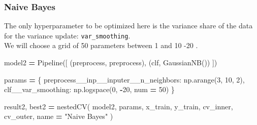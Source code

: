 \documentclass[
]{article}
\newenvironment{Shaded}{\begin{snugshade}}{\end{snugshade}}
\newcommand{\DecValTok}[1]{\textcolor[rgb]{0.00,0.00,0.81}{#1}}
\newcommand{\NormalTok}[1]{#1}
\newcommand{\OperatorTok}[1]{\textcolor[rgb]{0.81,0.36,0.00}{\textbf{#1}}}
\newcommand{\StringTok}[1]{\textcolor[rgb]{0.31,0.60,0.02}{#1}}
\begin{document}
\hypertarget{naive-bayes}{%
\subsubsection{Naive Bayes}\label{naive-bayes}}

The only hyperparameter to be optimized here is the variance share of
the data for the variance update: \texttt{var\_smoothing}.\\
We will choose a grid of 50 parameters between 1 and 10 -20 .

\begin{Shaded}
\begin{Highlighting}[]
\NormalTok{model2 }\OperatorTok{=}\NormalTok{ Pipeline([}
\NormalTok{    (}\StringTok{\textquotesingle{}preprocess\textquotesingle{}}\NormalTok{, preprocess),}
\NormalTok{    (}\StringTok{\textquotesingle{}clf\textquotesingle{}}\NormalTok{, GaussianNB())}
\NormalTok{])}

\NormalTok{params }\OperatorTok{=}\NormalTok{ \{}
    \StringTok{\textquotesingle{}preprocess\_\_inp\_\_inputer\_\_n\_neighbors\textquotesingle{}}\NormalTok{: np.arange(}\DecValTok{3}\NormalTok{, }\DecValTok{10}\NormalTok{, }\DecValTok{2}\NormalTok{),}
    \StringTok{\textquotesingle{}clf\_\_var\_smoothing\textquotesingle{}}\NormalTok{: np.logspace(}\DecValTok{0}\NormalTok{, }\OperatorTok{{-}}\DecValTok{20}\NormalTok{, num }\OperatorTok{=} \DecValTok{50}\NormalTok{)}
\NormalTok{\}}

\NormalTok{result2, best2 }\OperatorTok{=}\NormalTok{ nestedCV(}
\NormalTok{    model2, params, x\_train, y\_train,}
\NormalTok{    cv\_inner, cv\_outer, name }\OperatorTok{=} \StringTok{"Naive Bayes"}
\NormalTok{)}
\end{Highlighting}
\end{Shaded}

\begin{table}

\caption{\label{tab:unnamed-chunk-32}Naive Bayes best parameters}
\centering
{}
\end{table}
\end{document}
